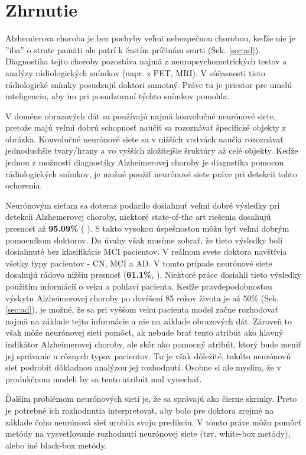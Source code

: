 \section{Zhrnutie}

Alzhemierova choroba je bez pochyby veľmi nebezpečnou chorobou, keďže nie je ''iba'' o strate pamäti ale patrí k častím príčinám smrti (Sek. \ref{sec:ad}). Diagnostika tejto choroby pozostáva najmä z neuropsychometrických testov a analýzy rádiologických snímkov (napr. z PET, MRI). V súčasnosti tieto rádiologické snímky posudzujú doktori samotný. Práve tu je priestor pre umelú inteligenciu, aby im pri posudzovaní týchto snímkov pomohla.

V doméne obrazových dát sa používajú najmä konvolučné neurónové siete, pretože majú veľmi dobrú schopnosť naučiť sa rozoznávať špecifické objekty z obrázka. Konvolučné neurónové siete sa v nižších vrstvách naučia rozoznávať jednoduchšie tvary/hrany a vo vyšších zložitejšie šruktúry až celé objekty. Keďže jednou z možností diagnostiky Alzheimerovej choroby je diagnstika pomocou rádiologických snímkov, je možné použiť neurónové siete práve pri detekcii tohto ochorenia.

Neurónovým sieťam sa doteraz podarilo dosiahnuť veľmi dobré výsledky pri detekcii Alzhemerovej choroby, niektoré state-of-the art riešenia dosahujú presnosť až \textbf{95.09\%} (\citeauthor*{suk2016deep} \citeyear{suk2016deep}). S takto vysokou úspešnosťou môžu byť veľmi dobrým pomocníkom doktorov. Do úvahy však musíme zobrať, že tieto výsledky boli dosiahnuté bez klasifikácie MCI pacientov. V reálnom svete doktora navštívia všetky typy pacientov - CN, MCI a AD. V tomto prípade neurónové siete dosahujú rádovo nižšiu presnosť (\textbf{61.1\%}, \citeauthor*{bohle2019layer} \citeyear{bohle2019layer}). Niektoré práce dosiahli tieto výsledky použitím informácií o veku a pohlaví pacienta. Keďže pravdepodobnosťou výskytu Alzheimerovej choroby po dovŕšení 85 rokov života je až 50\% (Sek. \ref{sec:ad}), je možné, že sa pri vyššom veku pacienta model začne rozhodovať najmä na základe tejto informácie a nie na základe obrazových dát. Zároveň to však môže neurónovej sieti pomôcť, ak nebude brať tento atribút ako hlavný indikátor Alzheimerovej choroby, ale skôr ako pomocný atribút, ktorý bude meniť jej správanie u rôznych typov pacientov. Tu je však dôležité, takúto neurónovú sieť podrobiť dôkladnou analýzou jej rozhodnutí. Osobne si ale myslím, že v produkčnom modeli by sa tento atribút mal vynechať. 

Ďaľším problémom neurónových sietí je, že sa správajú ako čierne skrinky. Preto je potrebné ich rozhodnutia interpretovať, aby bolo pre doktora zrejmé na základe čoho neurónová sieť urobila svoju predikciu. V tomto práve môžu pomôcť metódy na vysvetľovanie rozhodnutí neurónovej siete (tzv. white-box metódy), alebo iné black-box metódy.

